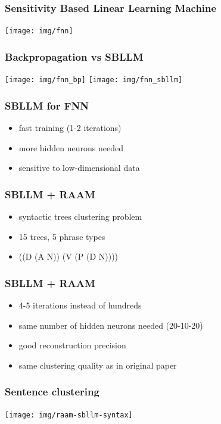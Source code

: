 \documentclass{beamer}
\begin{document}
\begin{frame}
\frametitle{Sensitivity Based Linear Learning Machine}
\begin{center}
	\texttt{[image: img/fnn]}
\end{center}
\end{frame}

\begin{frame}
\frametitle{Backpropagation vs SBLLM}
\begin{center}
	\texttt{[image: img/fnn\_bp]}
	\vspace{1.5cm}
	\texttt{[image: img/fnn\_sbllm]}
\end{center}
\end{frame}

\begin{frame}
\frametitle{SBLLM for FNN}
\begin{itemize}
	\item fast training (1-2 iterations)
	\item more hidden neurons needed
	\item sensitive to low-dimensional data
\end{itemize}
\end{frame}

\begin{frame}
\frametitle{SBLLM + RAAM}
\begin{itemize}
	\item syntactic trees clustering problem
	\item 15 trees, 5 phrase types
	\item ((D (A N)) (V (P (D N))))
\end{itemize}
\end{frame}

\begin{frame}
\frametitle{SBLLM + RAAM}
\begin{itemize}
	\item 4-5 iterations instead of hundreds
	\item same number of hidden neurons needed (20-10-20)
	\item good reconstruction precision
	\item same clustering quality as in original paper
\end{itemize}
\end{frame}

\begin{frame}
\frametitle{Sentence clustering}
\begin{center}
	\texttt{[image: img/raam-sbllm-syntax]}
\end{center}
\end{frame}
\end{document}
